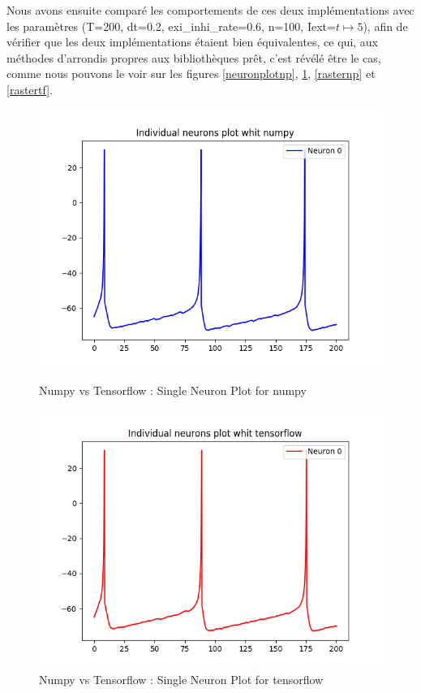 \documentclass[12pt]{scrartcl}
\begin{document}
\clearpage
Nous avons ensuite comparé les comportements de ces deux implémentations avec les paramètres (T=200, dt=0.2, exi\_inhi\_rate=0.6, n=100, Iext=$t\mapsto 5$), afin de vérifier que les deux implémentations étaient bien équivalentes, ce qui, aux méthodes d'arrondis propres aux bibliothèques prêt, c'est révélé être le cas, comme nous pouvons le voir sur les figures \ref{neuronplotnp}, \ref{neuronplottf}, \ref{rasternp} et \ref{rastertf}.\\

\begin{figure}[!h]
\begin{minipage}[l]{.48\linewidth}
\centering
\includegraphics[scale=0.5]{imgs/neuronplotnp.png}
\caption{Numpy vs Tensorflow : Single Neuron Plot for numpy}
\label{neuronplotnp}
\end{minipage}\hfill
\begin{minipage}[l]{.48\linewidth}
\centering
\includegraphics[scale=0.5]{imgs/neuronplottf.png}
\caption{Numpy vs Tensorflow : Single Neuron Plot for tensorflow}
\label{neuronplottf}
\end{minipage}\hfill
\end{figure}
\end{document}
